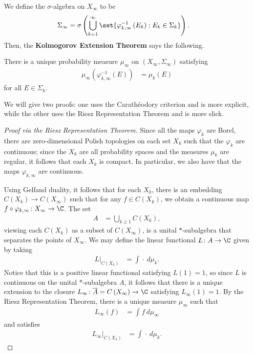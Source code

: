 \documentclass[10pt]{mypackage}
\begin{document}
We define the $\sigma$-algebra on $X_{\infty}$ to be
\begin{align*}
  \Sigma_{\infty} &= \sigma\left( \bigcup_{k=1}^{\infty}\set{\varphi_{k,\infty}^{-1}\left( E_k \right) : E_k\in \Sigma_k} \right).
\end{align*}
Then, the \textbf{Kolmogorov Extension Theorem} says the following.
\begin{theorem}
  There is a unique probability measure $\mu_{\infty}$ on $\left( X_{\infty},\Sigma_{\infty} \right)$ satisfying
  \begin{align*}
    \mu_{\infty} \left( \varphi_{k,\infty}^{-1}\left( E \right) \right) &= \mu_k\left( E \right)
  \end{align*}
  for all $E\in \Sigma_k$.
\end{theorem}
We will give two proofs: one uses the Carathéodory criterion and is more explicit, while the other uses the Riesz Representation Theorem and is more slick.
\begin{proof}[Proof via the Riesz Representation Theorem]
  Since all the maps $\varphi_k$ are Borel, there are zero-dimensional Polish topologies on each set $X_k$ such that the $\varphi_k$ are continuous; since the $X_k$ are all probability spaces and the measures $\mu_k$ are regular, it follows that each $X_k$ is compact. In particular, we also have that the maps $\varphi_{k,\infty}$ are continuous.

  Using Gelfand duality, it follows that for each $X_k$, there is an embedding $C\left( X_k \right)\rightarrow C\left( X_{\infty} \right)$ such that for any $f\in C\left( X_k \right)$, we obtain a continuous map $f\circ \varphi_{k,\infty}\colon X_{\infty}\rightarrow \C$. The set
  \begin{align*}
    A &= \bigcup_{k\geq 1} C\left( X_k \right),
  \end{align*}
  viewing each $C\left( X_k \right)$ as a subset of $C\left( X_{\infty} \right)$, is a unital $\ast$-subalgebra that separates the points of $X_{\infty}$. We may define the linear functional $L\colon A\rightarrow \C$ given by taking
  \begin{align*}
    L|_{C\left( X_k \right)} &= \int_{}^{} \cdot\:d\mu_k.
  \end{align*}
  Notice that this is a positive linear functional satisfying $L(1) = 1$, so since $L$ is continuous on the unital $\ast$-subalgebra $A$, it follows that there is a unique extension to the closure $ L_{\infty}\colon \overline{A} = C\left( X_{\infty} \right)\rightarrow \C $ satisfying $L_{\infty}(1) = 1$. By the Riesz Representation Theorem, there is a unique measure $\mu_{\infty}$ such that
  \begin{align*}
    L_{\infty}\left( f \right) &= \int_{}^{} f\:d\mu_{\infty}
  \end{align*}
  and satisfies
  \begin{align*}
    L_{\infty}|_{C\left( X_k \right)} &= \int_{}^{} \cdot\:d\mu_k.
  \end{align*}
\end{proof}
\end{document}
